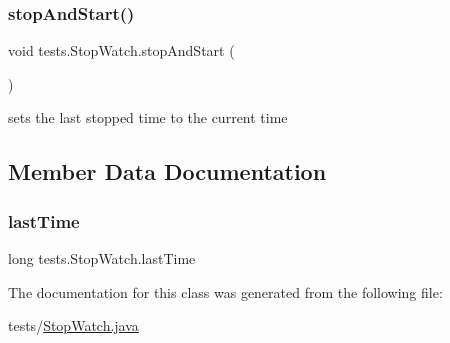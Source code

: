 \subsubsection{\texorpdfstring{stop\+And\+Start()}{stopAndStart()}}
{\footnotesize\ttfamily void tests.\+Stop\+Watch.\+stop\+And\+Start (\begin{DoxyParamCaption}{ }\end{DoxyParamCaption})}

sets the last stopped time to the current time 

\subsection{Member Data Documentation}
\mbox{\label{classtests_1_1_stop_watch_ae93f417b6d6f676582e08de8b15a0ab4}} 
\subsubsection{\texorpdfstring{last\+Time}{lastTime}}
{\footnotesize\ttfamily long tests.\+Stop\+Watch.\+last\+Time\hspace{0.3cm}{\ttfamily [private]}}



The documentation for this class was generated from the following file\+:\begin{DoxyCompactItemize}
\item 
tests/\mbox{\hyperlink{_stop_watch_8java}{Stop\+Watch.\+java}}\end{DoxyCompactItemize}
